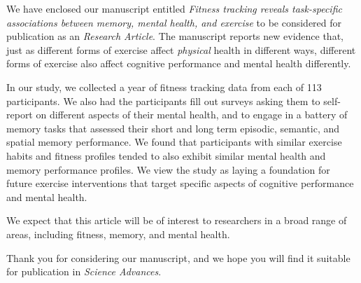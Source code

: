 \documentclass[11pt,stdletter,orderfromtodate,sigleft]{newlfm}
\begin{document}
\begin{newlfm}
We have enclosed our manuscript entitled \textit{Fitness tracking
  reveals task-specific associations between memory, mental health,
  and exercise} to be considered for publication as an
\textit{Research Article}.  The manuscript reports new evidence that, just as different
forms of exercise affect \textit{physical} health in different ways,
different forms of exercise also affect cognitive performance and
mental health differently.

In our study, we collected a year of fitness tracking data from each
of 113 participants.  We also had the participants fill out surveys
asking them to self-report on different aspects of their mental
health, and to engage in a battery of memory tasks that assessed their
short and long term episodic, semantic, and spatial memory
performance.  We found that participants with similar exercise habits
and fitness profiles tended to also exhibit similar mental health and
memory performance profiles.  We view the study as laying a foundation
for future exercise interventions that target specific aspects of
cognitive performance and mental health.


We expect that this article will be of interest to researchers in a
broad range of areas, including fitness, memory, and mental health.

Thank you for considering our manuscript, and we hope you will find it
suitable for publication in \textit{Science Advances}.


\end{newlfm}
\end{document}
